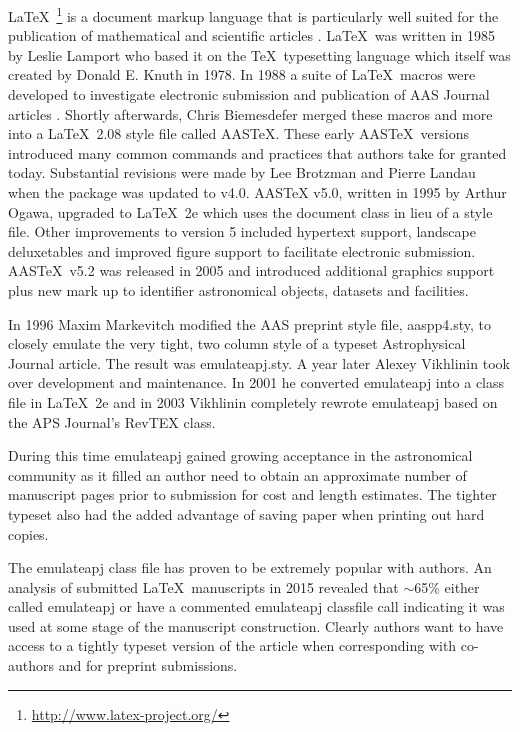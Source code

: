 \documentclass[linenumbers]{aastex631}
\newcommand\aastex{AAS\TeX}
\newcommand\latex{La\TeX}
\begin{document}
\latex\ \footnote{\url{http://www.latex-project.org/}} is a document markup
language that is particularly well suited for the publication of
mathematical and scientific articles \citep{lamport94}. \latex\ was written
in 1985 by Leslie Lamport who based it on the \TeX\ typesetting language
which itself was created by Donald E. Knuth in 1978.  In 1988 a suite of
\latex\ macros were developed to investigate electronic submission and
publication of AAS Journal articles \citep{1989BAAS...21..780H}.  Shortly
afterwards, Chris Biemesdefer merged these macros and more into a \latex\
2.08 style file called \aastex.  These early \aastex\ versions introduced
many common commands and practices that authors take for granted today.
Substantial revisions
were made by Lee Brotzman and Pierre Landau when the package was updated to
v4.0.  AASTeX v5.0, written in 1995 by Arthur Ogawa, upgraded to \latex\ 2e
which uses the document class in lieu of a style file.  Other improvements
to version 5 included hypertext support, landscape deluxetables and
improved figure support to facilitate electronic submission.  
\aastex\ v5.2 was released in 2005 and introduced additional graphics
support plus new mark up to identifier astronomical objects, datasets and
facilities.

In 1996 Maxim Markevitch modified the AAS preprint style file, aaspp4.sty,
to closely emulate the very tight, two column style of a typeset
Astrophysical Journal article.  The result was emulateapj.sty.  A year
later Alexey Vikhlinin took over development and maintenance.  In 2001 he
converted emulateapj into a class file in \latex\ 2e and in 2003 Vikhlinin
completely rewrote emulateapj based on the APS Journal's RevTEX class.

During this time emulateapj gained growing acceptance in the astronomical
community as it filled an author need to obtain an approximate number of
manuscript pages prior to submission for cost and length estimates. The
tighter typeset also had the added advantage of saving paper when printing
out hard copies.

The emulateapj class file has proven to be extremely popular with authors.  An 
analysis of submitted \latex\ manuscripts in 2015 revealed that $\sim$65\%
either called emulateapj or have a commented emulateapj classfile call
indicating it was used at some stage of the manuscript construction.
Clearly authors want to have access to a tightly typeset version of the
article when corresponding with co-authors and for preprint submissions.
\end{document}
